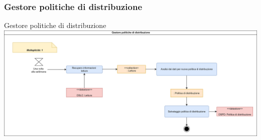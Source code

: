 \documentclass{beamer}
\begin{document}
	\begin{frame}
		\subsubsection{Gestore politiche di distribuzione}	
		\begin{block}{Gestore politiche di distribuzione}
			\includegraphics[width=\textwidth, height=0.85\textheight, keepaspectratio=true]{comp4.png}
		\end{block}
	\end{frame}	
	
\end{document}
